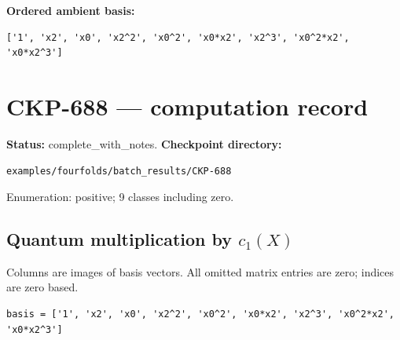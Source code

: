 \documentclass[10pt,a4paper]{article}
\begin{document}
\textbf{Ordered ambient basis:}
\begin{lstlisting}
['1', 'x2', 'x0', 'x2^2', 'x0^2', 'x0*x2', 'x2^3', 'x0^2*x2', 'x0*x2^3']
\end{lstlisting}

\clearpage\section*{CKP-688 --- computation record}
\textbf{Status:} complete\_with\_notes.
\textbf{Checkpoint directory:}
\begin{lstlisting}
examples/fourfolds/batch_results/CKP-688
\end{lstlisting}

Enumeration: positive; 9 classes including zero.
\subsection*{Quantum multiplication by $c_1(X)$}
Columns are images of basis vectors. All omitted matrix entries are zero; indices are zero based.

\begin{lstlisting}
basis = ['1', 'x2', 'x0', 'x2^2', 'x0^2', 'x0*x2', 'x2^3', 'x0^2*x2', 'x0*x2^3']
\end{lstlisting}
\end{document}
